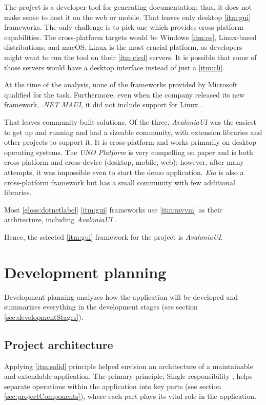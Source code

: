 The project is a developer tool for generating documentation; thus, it does not make sense to host it on the web or mobile. That leaves only desktop \ref{itm:gui} frameworks. The only challenge is to pick one which provides cross-platform capabilities. The cross-platform targets would be Windows \ref{itm:os}, Linux-based distributions, and macOS.
Linux is the most crucial platform, as developers might want to run the tool on their \ref{itm:cicd} servers. It is possible that some of those servers would have a desktop interface instead of just a \ref{itm:cli}.

At the time of the analysis, none of the frameworks provided by Microsoft qualified for the task. Furthermore, even when the company released its new framework, \textit{.NET MAUI}, it did not include support for Linux \cite{anderson_net_2022}.

That leaves community-built solutions.
Of the three, \textit{AvaloniaUI} was the easiest to get up and running and had a sizeable community, with extension libraries and other projects to support it. It is cross-platform and works primarily on desktop operating systems. The \textit{UNO Platform} is very compelling on paper and is both cross-platform and cross-device (desktop, mobile, web); however, after many attempts, it was impossible even to start the demo application. \textit{Eto} is also a cross-platform framework but has a small community with few additional libraries.

Most \ref{gloss:dotnetlabel} \ref{itm:gui} frameworks use \ref{itm:mvvm} as their architecture, including \textit{AvaloniaUI} \cite{katz_mvvm_2022}.

Hence, the selected \ref{itm:gui} framework for the project is \textit{AvaloniaUI}.

\section{Development planning}

Development planning analyzes how the application will be developed and summarizes everything in the development stages (see section \ref{sec:developmentStages}).

\subsection{Project architecture} \label{sec:projectArchitecture}

Applying \ref{itm:solid} principle helped envision an architecture of a maintainable and extendable application.
The primary principle, Single responsibility \cite{hall_adaptive_2017}, helps separate operations within the application into key parts (see section \ref{sec:projectComponents}), where each part plays its vital role in the application.

